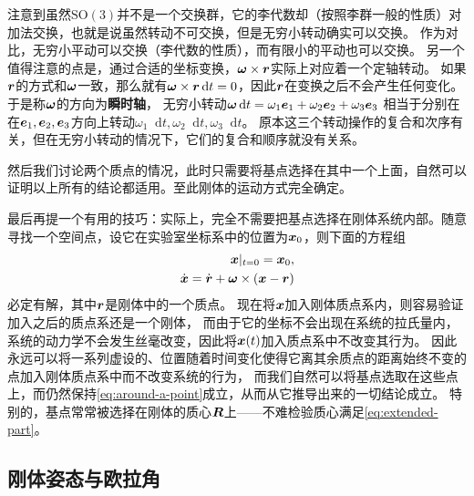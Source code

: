 \documentclass[UTF8, a4paper]{ctexart}
\renewcommand*{\dd}{\mathop{}\!\mathrm{d}}
\newcommand*{\sogroup}[1]{\mathrm{SO}(#1)}
\begin{document}
注意到虽然$\sogroup{3}$并不是一个交换群，它的李代数却（按照李群一般的性质）对加法交换，也就是说虽然转动不可交换，但是无穷小转动确实可以交换。
作为对比，无穷小平动可以交换（李代数的性质），而有限小的平动也可以交换。
另一个值得注意的点是，通过合适的坐标变换，$\vb*{\omega} \times \vb*{r}$实际上对应着一个定轴转动。
如果$\vb*{r}$的方式和$\vb*{\omega}$一致，那么就有$\vb*{\omega}\times \vb*{r} \dd t =0$，因此$\vb*{r}$在变换之后不会产生任何变化。
于是称$\vb*{\omega}$的方向为\textbf{瞬时轴}，
无穷小转动$\vb*{\omega} \dd t = \omega_1 \vb*{e}_1 + \omega_2 \vb*{e}_2 + \omega_3 \vb*{e}_3$
相当于分别在在$\vb*{e}_1, \vb*{e}_2, \vb*{e}_3$方向上转动$\omega_1 \dd t, \omega_2 \dd t, \omega_3 \dd t$。
原本这三个转动操作的复合和次序有关，但在无穷小转动的情况下，它们的复合和顺序就没有关系。

然后我们讨论两个质点的情况，此时只需要将基点选择在其中一个上面，自然可以证明以上所有的结论都适用。至此刚体的运动方式完全确定。

最后再提一个有用的技巧：实际上，完全不需要把基点选择在刚体系统内部。随意寻找一个空间点，设它在实验室坐标系中的位置为$\vb*{x}_0$，则下面的方程组
\begin{equation}
    \begin{split}
        \vb*{x}|_{t=0} = \vb*{x}_0, \\
        \dot{\vb*{x}} = \dot{\vb*{r}} + \vb*{\omega} \times (\vb*{x} - \vb*{r})
    \end{split}
    \label{eq:extended-part}
\end{equation}
必定有解，其中$\vb*{r}$是刚体中的一个质点。
现在将$\vb*{x}$加入刚体质点系内，则容易验证加入之后的质点系还是一个刚体，
而由于它的坐标不会出现在系统的拉氏量内，系统的动力学不会发生丝毫改变，因此将$\vb*{x}(t)$加入质点系中不改变其行为。
因此永远可以将一系列虚设的、位置随着时间变化使得它离其余质点的距离始终不变的点加入刚体质点系中而不改变系统的行为，
而我们自然可以将基点选取在这些点上，而仍然保持\eqref{eq:around-a-point}成立，从而从它推导出来的一切结论成立。
特别的，基点常常被选择在刚体的质心$\vb*{R}$上——不难检验质心满足\eqref{eq:extended-part}。

\subsection{刚体姿态与欧拉角}\label{sec:euler-angle}
\end{document}
